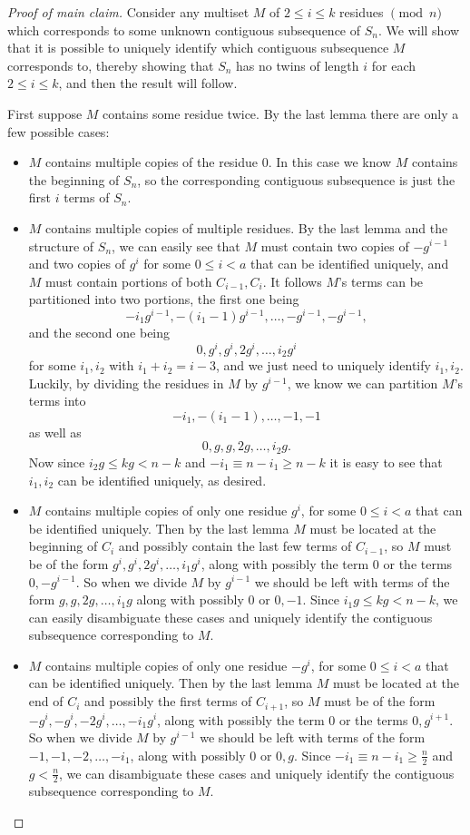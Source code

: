 \documentclass[11pt]{scrartcl}
\begin{document}
\begin{proof}
  [Proof of main claim]
Consider any multiset $M$ of $2\le i\le k$ residues $\pmod n$ which corresponds to some unknown contiguous subsequence of $S_n$. We will show that it is possible to uniquely identify which contiguous subsequence $M$ corresponds to, thereby showing that $S_n$ has no twins of length $i$ for each $2\le i\le k$, and then the result will follow.

First suppose $M$ contains some residue twice. By the last lemma there are only a few possible cases: \begin{itemize}
    \item $M$ contains multiple copies of the residue $0$. In this case we know $M$ contains the beginning of $S_n$, so the corresponding contiguous subsequence is just the first $i$ terms of $S_n$.
    \item $M$ contains multiple copies of multiple residues. By the last lemma and the structure of $S_n$, we can easily see that $M$ must contain two copies of $-g^{i-1}$ and two copies of $g^i$ for some $0 \le i < a$ that can be identified uniquely, and $M$ must contain portions of both $C_{i-1}, C_i$. It follows $M$'s terms can be partitioned into two portions, the first one being  \[-i_1g^{i-1}, -(i_1-1)g^{i-1}, \dots, -g^{i-1}, -g^{i-1},\] and the second one being \[0, g^i, g^i, 2g^i, \dots, i_2 g^i\] for some $i_1,i_2$ with $i_1+i_2 = i-3$, and we just need to uniquely identify $i_1, i_2$. Luckily, by dividing the residues in $M$ by $g^{i-1}$, we know we can partition $M$'s terms into \[-i_1, -(i_1-1), \dots, -1, -1\] as well as \[0, g, g, 2g, \dots, i_2g. \] Now since $i_2g \le kg < n-k$ and $-i_1 \equiv n - i_1 \ge n-k$ it is easy to see that $i_1,i_2$ can be identified uniquely, as desired.
    \item $M$ contains multiple copies of only one residue $g^i$, for some $0\le i < a$ that can be identified uniquely. Then by the last lemma $M$ must be located at the beginning of $C_i$ and possibly contain the last few terms of $C_{i-1}$, so $M$ must be of the form $g^i, g^i, 2g^i, \dots, i_1g^i$, along with possibly the term $0$ or the terms $0, -g^{i-1}$. So when we divide $M$ by $g^{i-1}$ we should be left with terms of the form $g, g, 2g, \dots, i_1g$ along with possibly $0$ or $0,-1$. Since $i_1g \le kg < n-k$, we can easily disambiguate these cases and uniquely identify the contiguous subsequence corresponding to $M$.
    \item $M$ contains multiple copies of only one residue $-g^i$, for some $0 \le i < a$ that can be identified uniquely. Then by the last lemma $M$ must be located at the end of $C_i$ and possibly the first terms of $C_{i + 1}$, so $M$ must be of the form $-g^i, -g^i, -2g^i, \dots, -i_1g^i$, along with possibly the term $0$ or the terms $0, g^{i+1}$. So when we divide $M$ by $g^{i-1}$ we should be left with terms of the form $-1,-1,-2, \dots, -i_1$, along with possibly $0$ or $0, g$. Since $-i_1\equiv n-i_1 \ge \frac{n}{2}$ and $g < \frac{n}{2}$, we can disambiguate these cases and uniquely identify the contiguous subsequence corresponding to $M$.

\end{itemize}
\end{proof}
\end{document}
